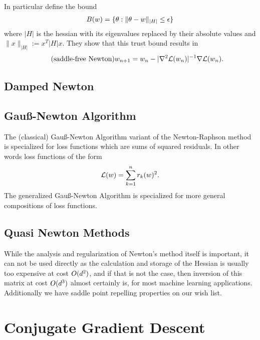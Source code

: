 In particular \textcite{dauphinIdentifyingAttackingSaddle2014} define the bound
\begin{align*}
	B(w) = \{ \theta : \|\theta-w\|_{|H|} \le \epsilon\}
\end{align*}
where \(|H|\) is the hessian with its eigenvalues replaced by their absolute values
and \(\|x\|_{|H|}:= x^T |H| x\). They show that this trust bound results in
\begin{align*}
	\tag{saddle-free Newton}
	w_{n+1}	= w_n - |\nabla^2\mathcal{L}(w_n)|^{-1}\nabla\mathcal{L}(w_n).
\end{align*}

\subsection{Damped Newton}

\subsection{Gauß-Newton Algorithm}

The (classical) Gauß-Newton Algorithm variant of the Newton-Raphson method
is specialized for loss functions which are sums of squared residuals. In other
words loss functions of the form
\begin{align*}
	\mathcal{L}(w) = \sum_{k=1}^n r_k(w)^2.
\end{align*}
The generalized Gauß-Newton Algorithm is specialized for more general
compositions of loss functions.
\textcite{bottouOptimizationMethodsLargeScale2018}

\subsection{Quasi Newton Methods}

While the analysis and regularization of Newton's method itself is important,
it can not be used directly as the calculation and storage of the Hessian is
usually too expensive at cost \(O(d^2)\), and if that is not the case,
then inversion of this matrix at cost \(O(d^3)\) almost certainly is,
for most machine learning applications. Additionally we have saddle point
repelling properties on our wish list.



\section{Conjugate Gradient Descent}


